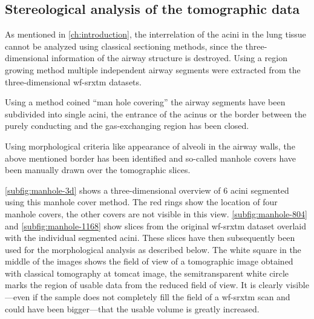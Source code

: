 \subsection{Stereological analysis of the tomographic data\label{subsec:stereological analyis}}
As mentioned in \autoref{ch:introduction}, the interrelation of the acini in the lung tissue cannot be analyzed using classical sectioning methods, since the three-dimensional information of the airway structure is destroyed. Using a region growing method multiple independent airway segments were extracted from the three-dimensional \ac{wf-srxtm} datasets.

Using a method coined ``man hole covering'' the airway segments have been subdivided into single acini, \ie the entrance of the acinus or the border between the purely conducting and the gas-exchanging region has been closed. 

Using morphological criteria like appearance of alveoli in the airway walls, the above mentioned border has been identified and so-called manhole covers have been manually drawn over the tomographic slices. 

\autoref{subfig:manhole-3d} shows a three-dimensional overview of 6 acini segmented using this manhole cover method. The red rings show the location of four manhole covers, the other covers are not visible in this view. \autoref{subfig:manhole-804} and \ref{subfig:manhole-1168} show slices from the original \ac{wf-srxtm} dataset overlaid with the individual segmented acini. These slices have then subsequently been used for the morphological analysis as described below. The white square in the middle of the images shows the field of view of a tomographic image obtained with classical tomography at \ac{tomcat} image, the semitransparent white circle marks the region of usable data from the reduced field of view. It is clearly visible---even if the sample does not completely fill the field of a \ac{wf-srxtm} scan and could have been bigger---that the usable volume is greatly increased.

